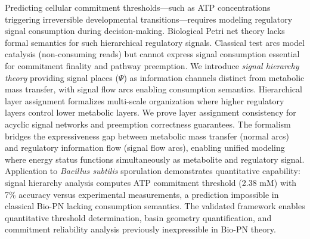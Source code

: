 Predicting cellular commitment thresholds---such as ATP concentrations triggering irreversible developmental transitions---requires modeling regulatory signal consumption during decision-making. Biological Petri net theory lacks formal semantics for such hierarchical regulatory signals. Classical test arcs model catalysis (non-consuming reads) but cannot express signal consumption essential for commitment finality and pathway preemption. We introduce \textit{signal hierarchy theory} providing signal places ($\Psi$) as information channels distinct from metabolic mass transfer, with signal flow arcs enabling consumption semantics. Hierarchical layer assignment formalizes multi-scale organization where higher regulatory layers control lower metabolic layers. We prove layer assignment consistency for acyclic signal networks and preemption correctness guarantees. The formalism bridges the expressiveness gap between metabolic mass transfer (normal arcs) and regulatory information flow (signal flow arcs), enabling unified modeling where energy status functions simultaneously as metabolite and regulatory signal. Application to \textit{Bacillus subtilis} sporulation demonstrates quantitative capability: signal hierarchy analysis computes ATP commitment threshold (2.38 mM) with 7\% accuracy versus experimental measurements, a prediction impossible in classical Bio-PN lacking consumption semantics. The validated framework enables quantitative threshold determination, basin geometry quantification, and commitment reliability analysis previously inexpressible in Bio-PN theory.
